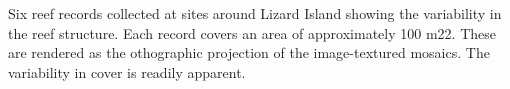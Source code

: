 \label{fig:six_samples} Six reef records collected at sites around Lizard Island showing the variability in the reef structure. Each record covers an area of approximately 100 m22. These are rendered as the othographic projection of the image-textured mosaics. The variability in cover is readily apparent.